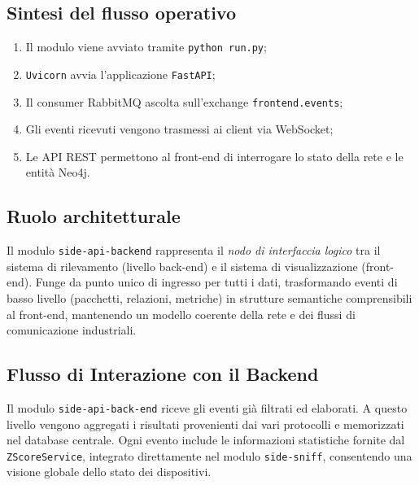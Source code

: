 \subsection{Sintesi del flusso operativo}
\begin{enumerate}
  \item Il modulo viene avviato tramite \texttt{python run.py};
  \item \texttt{Uvicorn} avvia l’applicazione \texttt{FastAPI};
  \item Il consumer RabbitMQ ascolta sull’exchange \texttt{frontend.events};
  \item Gli eventi ricevuti vengono trasmessi ai client via WebSocket;
  \item Le API REST permettono al front-end di interrogare lo stato della rete e le entità Neo4j.
\end{enumerate}

\subsection{Ruolo architetturale}
Il modulo \texttt{side-api-backend} rappresenta il \textit{nodo di interfaccia logico} tra il sistema di rilevamento (livello back-end) e il sistema di visualizzazione (front-end).  
Funge da punto unico di ingresso per tutti i dati, trasformando eventi di basso livello (pacchetti, relazioni, metriche) in strutture semantiche comprensibili al front-end, mantenendo un modello coerente della rete e dei flussi di comunicazione industriali.


\subsection{Flusso di Interazione con il Backend}

Il modulo \texttt{side-api-back-end} riceve gli eventi già filtrati ed elaborati.  
A questo livello vengono aggregati i risultati provenienti dai vari protocolli e memorizzati nel database centrale.  
Ogni evento include le informazioni statistiche fornite dal \texttt{ZScoreService}, integrato direttamente nel modulo \texttt{side-sniff}, consentendo una visione globale dello stato dei dispositivi.

